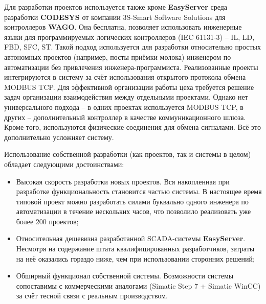 Для разработки проектов используется также кроме \textbf{EasyServer} среда
разработки \textbf{CODESYS} от компании 3S-Smart Software Solutions для
контроллеров \textbf{WAGO}. Она бесплатна, позволяет использовать инженерные
языки для программируемых логических контроллеров (IEC 61131-3) – IL, LD, FBD,
SFC, ST. Такой подход используется для разработки относительно простых
автономных проектов (например, посты приёмки молока) инженером по автоматизации
без привлечения инженера-программиста. Реализованные проекты интегрируются в
систему за счёт использования открытого протокола обмена MODBUS TCP. Для
эффективной организации работы цеха требуется решение задач организации
взаимодействия между отдельными проектами. Однако нет универсального подхода – в
одних проектах используется MODBUS TCP, в других – дополнительный контроллер в
качестве коммуникационного шлюза. Кроме того, используются физические соединения
для обмена сигналами. Всё это дополнительно усложняет систему.

Использование собственной разработки (как проектов, так и системы в целом)
обладает следующими достоинствами:
\begin{itemize}
    \item Высокая скорость разработки новых проектов. Вся накопленная при
    разработке функциональность становится частью системы. В настоящее время
    типовой проект можно разработать силами буквально одного инженера по
    автоматизации в течение нескольких часов, что позволило реализовать уже
    более 200 проектов;
    \item Относительная дешевизна разработанной SCADA-системы
    \textbf{EasyServer}. Несмотря на содержание штата квалифицированных
    разработчиков, затраты на неё оказались гораздо ниже, чем при использовании
    сторонних решений;
    \item Обширный функционал собственной системы. Возможности системы
    сопоставимы с коммерческими аналогами (Simatic Step 7 + Simatic WinCC) за
    счёт тесной связи с реальным производством.
\end{itemize}

